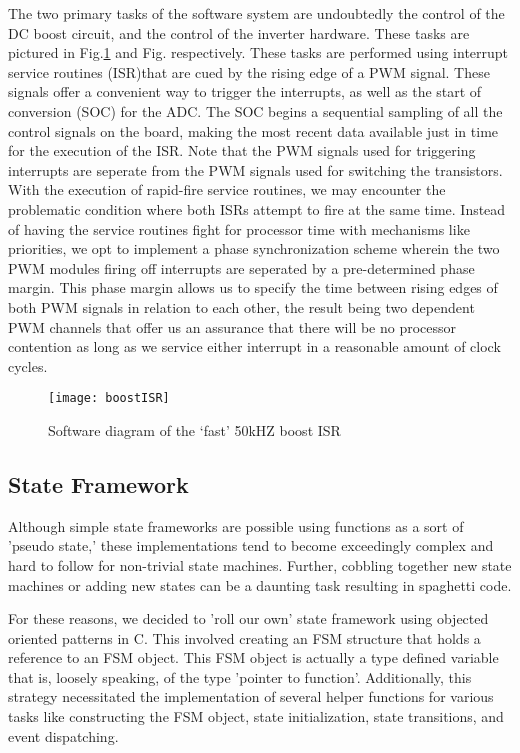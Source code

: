 The two primary tasks of the software system are undoubtedly the control of the DC boost circuit, and the control of the inverter hardware. These tasks are pictured in Fig.\ref{fast} and Fig.\cite{slow} respectively. These tasks are performed using interrupt service routines (ISR)that are cued by the rising edge of a PWM signal. These signals offer a convenient way to trigger the interrupts, as well as the start of conversion (SOC) for the ADC. The SOC begins a sequential sampling of all the control signals on the board, making the most recent data available just in time for the execution of the ISR. Note that the PWM signals used for triggering interrupts are seperate from the PWM signals used for switching the transistors. With the execution of rapid-fire service routines, we may encounter the problematic condition where both ISRs attempt to fire at the same time. Instead of having the service routines fight for processor time with mechanisms like priorities, we opt to implement a phase synchronization scheme wherein the two PWM modules firing off interrupts are seperated by a pre-determined phase margin. This phase margin allows us to specify the time between rising edges of both PWM signals in relation to each other, the result being two dependent PWM channels that offer us an assurance that there will be no processor contention as long as we service either interrupt in a reasonable amount of clock cycles.

\begin{figure}[h]
\begin{center}
\texttt{[image: boostISR]}
\caption{Software diagram of the `fast' 50kHZ boost ISR}
\label{fast}
\end{center}
\end{figure}

\subsection{State Framework}
Although simple state frameworks are possible using functions as a sort of 'pseudo state,' these implementations tend to become exceedingly complex and hard to follow for non-trivial state machines. Further, cobbling together new state machines or adding new states can be a daunting task resulting in spaghetti code. 

For these reasons, we decided to 'roll our own' state framework using objected oriented patterns in C. This involved creating an FSM structure that holds a reference to an FSM object. This FSM object is actually a type defined variable that is, loosely speaking, of the type 'pointer to function'. Additionally, this strategy necessitated the implementation of several helper functions for various tasks like constructing the FSM object, state initialization, state transitions, and event dispatching. 

